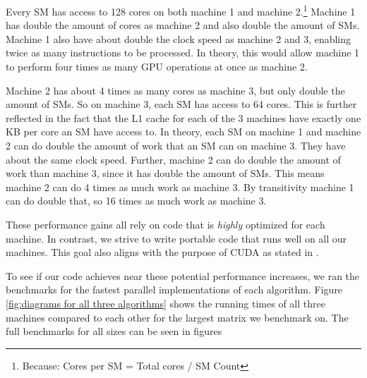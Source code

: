 Every SM has access to 128 cores on both machine 1 and machine 2.\footnote{Because: Cores per SM = Total cores / SM Count} Machine 1 has double the amount of cores as machine 2 and also double the amount of SMs. Machine 1 also have about double the clock speed as machine 2 and 3, enabling twice as many instructions to be processed. In theory, this would allow machine 1 to perform four times as many GPU operations at once as machine 2.

Machine 2 has about 4 times as many cores as machine 3, but only double the amount of SMs. So on machine 3, each SM has access to 64 cores. This is further reflected in the fact that the L1 cache for each of the 3 machines have exactly one KB per core an SM have access to. In theory, each SM on machine 1 and machine 2 can do double the amount of work that an SM can on machine 3. They have about the same clock speed. Further, machine 2 can do double the amount of work than machine 3, since it has double the amount of SMs. This means machine 2 can do 4 times as much work as machine 3. By transitivity machine 1 can do double that, so 16 times as much work as machine 3.

These performance gains all rely on code that is \textit{highly} optimized for each machine. In contrast, we strive to write portable code that runs well on all our machines. This goal also aligns with the purpose of CUDA as stated in \cite[Section 1.3]{nvidia:cudadoc}.

To see if our code achieves near these potential performance increases, we ran the benchmarks for the fastest parallel implementations of each algorithm. Figure \ref{fig:diagrams for all three algorithms} shows the running times of all three machines compared to each other for the largest matrix we benchmark on. The full benchmarks for all sizes can be seen in figures 

